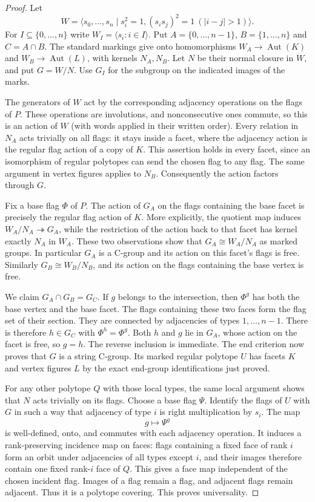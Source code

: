\documentclass[11pt,a4paper]{article}
\newcommand{\gen}[1]{\langle#1\rangle}
\begin{document}
\begin{proof}
Let
\[
 W=\gen{s_0,\ldots,s_n\mid s_i^2=1,
                 (s_is_j)^2=1\ (|i-j|>1)}.
\]
For $I\subseteq\{0,\ldots,n\}$ write $W_I=\gen{s_i:i\in I}$.
Put $A=\{0,\ldots,n-1\}$, $B=\{1,\ldots,n\}$ and $C=A\cap B$.
The standard markings give onto homomorphisms
$W_A\to\operatorname{Aut}(K)$ and
$W_B\to\operatorname{Aut}(L)$, with kernels $N_A,N_B$.
Let $N$ be their normal closure in $W$, and put $G=W/N$.
Use $G_I$ for the subgroup on the indicated images of the marks.

The generators of $W$ act by the corresponding adjacency operations on
the flags of $P$. These operations are involutions, and nonconsecutive
ones commute, so this is an action of $W$ (with words applied in their
written order). Every relation in $N_A$ acts trivially on all flags:
it stays inside a facet, where the adjacency action is the regular
flag action of a copy of $K$. This assertion holds in every facet,
since an isomorphism of regular polytopes can send the chosen flag to
any flag. The same argument in vertex figures applies to $N_B$.
Consequently the action factors through $G$.

Fix a base flag $\Phi$ of $P$. The action of $G_A$ on the flags containing
the base facet is precisely the regular flag action of $K$.
More explicitly, the quotient map induces
$W_A/N_A\twoheadrightarrow G_A$, while the restriction of the action
back to that facet has kernel exactly $N_A$ in $W_A$.
These two observations show that $G_A\cong W_A/N_A$ as marked groups.
In particular $G_A$ is a C-group and its action on this facet's flags
is free. Similarly $G_B\cong W_B/N_B$, and its action on the flags
containing the base vertex is free.

We claim $G_A\cap G_B=G_C$. If $g$ belongs to the intersection, then
$\Phi^g$ has both the base vertex and the base facet. The flags containing
these two faces form the flag set of their section. They are connected
by adjacencies of types $1,\ldots,n-1$. There is therefore $h\in G_C$
with $\Phi^h=\Phi^g$. Both $h$ and $g$ lie in $G_A$, whose action on
the facet is free, so $g=h$. The reverse inclusion is immediate.
The end criterion now proves that $G$ is a string C-group. Its marked
regular polytope $U$ has facets $K$ and vertex figures $L$ by the exact
end-group identifications just proved.

For any other polytope $Q$ with those local types, the same local
argument shows that $N$ acts trivially on its flags. Choose a base
flag $\Psi$. Identify the flags of $U$ with $G$ in such a way that
adjacency of type $i$ is right multiplication by $s_i$. The map
\[
                  g\longmapsto\Psi^g
\]
is well-defined, onto, and commutes with each adjacency operation.
It induces a rank-preserving incidence map on faces: flags containing
a fixed face of rank $i$ form an orbit under adjacencies of all types
except $i$, and their images therefore contain one fixed rank-$i$
face of $Q$. This gives a face map independent of the chosen incident
flag. Images of a flag remain a flag, and adjacent flags remain
adjacent. Thus it is a polytope covering. This proves universality.
\end{proof}
\end{document}
